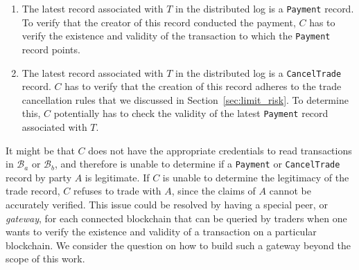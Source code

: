 \begin{enumerate}
	\item The latest record associated with $ T $ in the distributed log is a \texttt{Payment} record.
	To verify that the creator of this record conducted the payment, $ C $ has to verify the existence and validity of the transaction to which the \texttt{Payment} record points.
	\item The latest record associated with $ T $ in the distributed log is a \texttt{CancelTrade} record.
	$ C $ has to verify that the creation of this record adheres to the trade cancellation rules that we discussed in Section~\ref{sec:limit_risk}.
	To determine this, $ C $ potentially has to check the validity of the latest \texttt{Payment} record associated with $ T $.
\end{enumerate}

It might be that $ C $ does not have the appropriate credentials to read transactions in $ \mathcal{B}_a $ or $ \mathcal{B}_b $, and therefore is unable to determine if a \texttt{Payment} or \texttt{CancelTrade} record by party $ A $ is legitimate.
If $ C $ is unable to determine the legitimacy of the trade record, $ C $ refuses to trade with $ A $, since the claims of $ A $ cannot be accurately verified.
This issue could be resolved by having a special peer, or \emph{gateway}, for each connected blockchain that can be queried by traders when one wants to verify the existence and validity of a transaction on a particular blockchain.
We consider the question on how to build such a gateway beyond the scope of this work.



